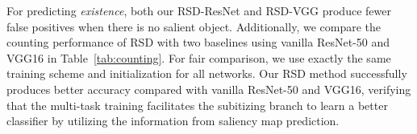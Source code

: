 \documentclass[10pt,twocolumn,letterpaper]{article}
\newcommand{\ignore}[1]{}
\begin{document}
For predicting \emph{existence}, both our RSD-ResNet and RSD-VGG produce fewer false positives when there is no salient object. 
Additionally, we compare the counting performance of RSD with two baselines using vanilla ResNet-50 and VGG16 in Table~\ref{tab:counting}. For fair comparison, we use exactly the same training scheme and initialization for all networks. 
Our RSD method successfully produces better accuracy compared with vanilla ResNet-50 and VGG16, verifying that the multi-task training facilitates the subitizing branch to learn a better classifier by utilizing the information from saliency map prediction. 
%
\ignore{
\begin{figure}[t]
    \centering
        \texttt{[image: Figs/confusion\_ours\_resnet.pdf]}
        \texttt{[image: Figs/confusion\_ours\_vgg.pdf]}
 	\caption{The confusion matrix of the results by our subitizing branch of RSD-ResNet (left) and RSD-VGG (right).}
    \label{fig:confusion}
\end{figure}
}
\end{document}
